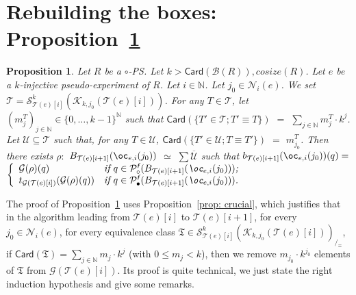 \documentclass{article}
\newcommand{\target}[1]{t_{#1}}
\theoremstyle{plain}
\newtheorem{prop}[theorem]{Proposition}
\newcommand{\Nat}{\ensuremath{\mathbb{N}}}
\newcommand{\nontrivialconnected}[3]{\mathcal{S}_{#1}^{#3}(#2)}
\newcommand{\taylor}[2]{\mathcal{T}(#1)[#2]}
\newcommand{\criticalports}[3]{\mathcal{K}_{#2, #3}(#1)}
\newcommand{\groundof}[1]{\mathcal{G}(#1)}
\newcommand{\cosize}[1]{\textit{cosize}(#1)}
\newcommand{\cod}{\oc}
\newcommand{\Card}[1]{\textsf{Card}\left( #1 \right)}
\newcommand{\conclusionscirc}[1]{\mathcal{P}_\circ^{\textsf{f}}(#1)}
\newcommand{\conclusionsnotcirc}[1]{\mathcal{P}_\bullet^{\textsf{f}}(#1)}
\newcommand{\boxes}[1]{\mathcal{B}(#1)}
\begin{document}
\section{Rebuilding the boxes: Proposition~\ref{prop: rebuilding boxes}}\label{appendix: rebuilding boxes}


\begin{prop}\label{prop: rebuilding boxes}
Let $R$ be a $\circ$-PS. Let $k > \Card{\boxes{R}{}}, \cosize{R}$. 
Let $e$ be a $k$-injective pseudo-experiment of $R$. Let $i \in \Nat$. Let $j_0 \in \mathcal{N}_i(e)$. 
We set $\mathcal{T} = \nontrivialconnected{\taylor{e}{i}}{\criticalports{\taylor{e}{i}}{k}{j_0}}{k}$. 
For any $T \in \mathcal{T}$, let $(m_j^T)_{j \in \Nat} \in \{ 0, \ldots, k-1 \}^\Nat$ such that $\Card{\{ T' \in \mathcal{T} ; T' \equiv T \}}$ $=$ $\sum_{j \in \Nat} m_j^T \cdot k^j$. 
Let $\mathcal{U} \subseteq \mathcal{T}$ such that, 
for any $T \in \mathcal{U}$,  $\Card{\{ T' \in \mathcal{U} ; T \equiv T' \}}$ $=$ $m_{j_0}^T$. 
Then there exists $\rho: $ $B_{\taylor{e}{i+1}}(\cod_{e, i}(j_0))$ $\simeq$ $\sum \overline{\mathcal{U}}$ such that 
$b_{\taylor{e}{i+1}}(\cod_{e, i}(j_0))(q) =$\\ $\left\lbrace \begin{array}{ll} 
\groundof{\rho}(q) & \textit{if $q \in \conclusionscirc{B_{\taylor{e}{i+1}}(\cod_{e, i}(j_0))}$;}\\
\target{\groundof{\taylor{e}{i}}}(\groundof{\rho}(q)) & \textit{if $q \in \conclusionsnotcirc{B_{\taylor{e}{i+1}}(\cod_{e, i}(j_0))}$.}
\end{array} \right.$
\end{prop}


The proof of Proposition~\ref{prop: rebuilding boxes} uses Proposition~\ref{prop: crucial}, which justifies that in the algorithm leading from $\taylor{e}{i}$ to $\taylor{e}{i+1}$, for every $j_0 \in \mathcal{N}_i(e)$, for every equivalence class $\mathfrak{T} \in \nontrivialconnected{\taylor{e}{i}}{\criticalports{\taylor{e}{i}}{k}{j_0}}{k}_{/_\equiv}$, if $\Card{\mathfrak{T}} = \sum_{j \in \Nat} m_j \cdot k^j$ (with $0 \leq m_j <k$), then we remove $m_{j_0} \cdot k^{j_0}$ elements of $\mathfrak{T}$ from $\groundof{\taylor{e}{i}}$. Its proof is quite technical, we just state the right induction hypothesis and give some remarks. 
\end{document}
